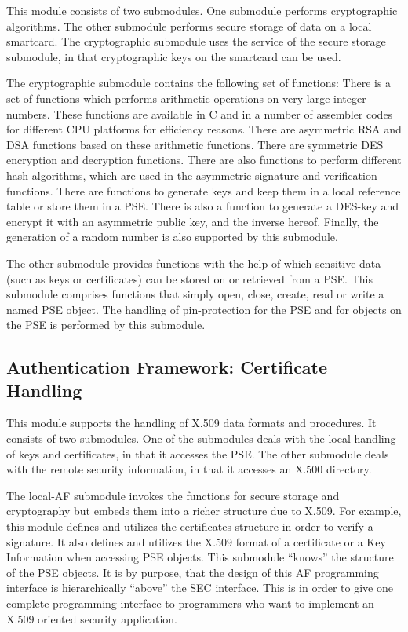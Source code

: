 This module consists of two submodules.
One submodule performs cryptographic algorithms.
The other submodule performs secure storage of data on a local smartcard.
The cryptographic submodule uses the service of the secure storage submodule,
in that cryptographic keys on the smartcard can be used.

The cryptographic submodule contains the following set of functions:
There is a set of functions which performs arithmetic operations
on very large integer numbers. These functions are available in C
and in a number of assembler codes for different CPU platforms
for efficiency reasons.
There are asymmetric RSA and DSA functions based on these arithmetic functions.
There are symmetric DES
encryption and decryption functions.
There are also functions to perform different hash algorithms,
which are used in the asymmetric signature and verification functions.
There are functions to generate keys and keep them
in a local reference table or store them in a PSE.
There is also a function to generate a DES-key
and encrypt it with an asymmetric public key,
and the inverse hereof.
Finally, the generation of a random number is also supported
by this submodule.

The other submodule provides functions with the help of which
sensitive data (such as keys or certificates)
can be stored on or retrieved from a PSE.
This submodule comprises functions that simply
open, close, create, read or write a named PSE object.
The handling of pin-protection for the PSE and for
objects on the PSE is performed by this
submodule.

\subsection{Authentication Framework: Certificate Handling}
\label{isw-af}

This module supports the handling of X.509 data formats and procedures.
It consists of two submodules. One of the submodules
deals with the local handling of keys and certificates,
in that it accesses the PSE.
The other submodule deals with the remote security information,
in that it accesses an X.500 directory.

The local-AF submodule
invokes the functions for secure storage and cryptography
but embeds them into a richer structure due to X.509.
For example, this module defines and utilizes the certificates
structure in order to verify a signature.
It also defines and utilizes the X.509 format of a certificate
or a Key Information when accessing PSE objects.
This submodule ``knows'' the structure of the PSE objects.
It is by purpose, that the design of this AF programming interface
is hierarchically ``above'' the SEC interface.
This is in order to give one complete programming interface to programmers
who want to implement an X.509 oriented security application.

